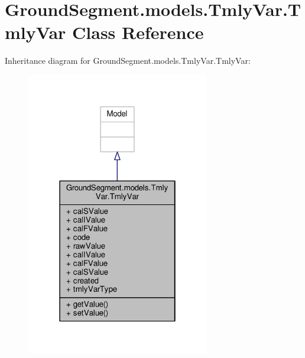\hypertarget{class_ground_segment_1_1models_1_1_tmly_var_1_1_tmly_var}{}\section{Ground\+Segment.\+models.\+Tmly\+Var.\+Tmly\+Var Class Reference}
\label{class_ground_segment_1_1models_1_1_tmly_var_1_1_tmly_var}


Inheritance diagram for Ground\+Segment.\+models.\+Tmly\+Var.\+Tmly\+Var\+:\nopagebreak
\begin{figure}[H]
\begin{center}
\leavevmode
\includegraphics[width=226pt]{class_ground_segment_1_1models_1_1_tmly_var_1_1_tmly_var__inherit__graph}
\end{center}
\end{figure}


